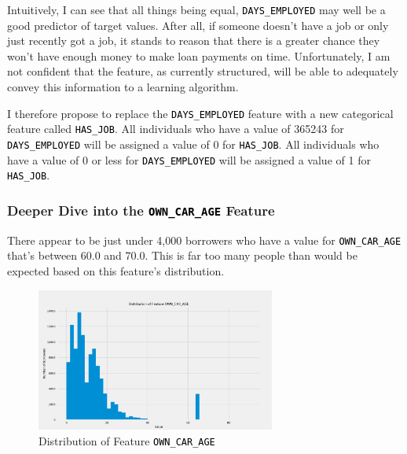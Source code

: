 \documentclass[12pt, letterpaper]{article}
\begin{document}
Intuitively, I can see that all things being equal, \colorbox{backcolor}{\textcolor{black}{\texttt{DAYS_EMPLOYED}}} may well be a good predictor of target values. After all, if someone doesn't have a job or only just recently got a job, it stands to reason that there is a greater chance they won't have enough money to make loan payments on time. Unfortunately, I am not confident that the feature, as currently structured, will be able to adequately convey this information to a learning algorithm.

I therefore propose to replace the \colorbox{backcolor}{\textcolor{black}{\texttt{DAYS_EMPLOYED}}} feature with a new categorical feature called \colorbox{backcolor}{\textcolor{black}{\texttt{HAS_JOB}}}. All individuals who have a value of 365243 for \colorbox{backcolor}{\textcolor{black}{\texttt{DAYS_EMPLOYED}}} will be assigned a value of 0 for \colorbox{backcolor}{\textcolor{black}{\texttt{HAS_JOB}}}. All individuals who have a value of 0 or less for \colorbox{backcolor}{\textcolor{black}{\texttt{DAYS_EMPLOYED}}} will be assigned a value of 1 for \colorbox{backcolor}{\textcolor{black}{\texttt{HAS_JOB}}}.

\subsubsection{Deeper Dive into the \colorbox{backcolor}{\textcolor{black}{\texttt{OWN_CAR_AGE}}} Feature}
There appear to be just under 4,000 borrowers who have a value for \colorbox{backcolor}{\textcolor{black}{\texttt{OWN_CAR_AGE}}} that's between 60.0 and 70.0. This is far too many people than would be expected based on this feature's distribution.

\begin{figure}[ht]
\includegraphics[width=0.7\textwidth]{distribOWNCARAGE}
\centering
\caption{Distribution of Feature \colorbox{backcolor}{\textcolor{black}{\texttt{OWN_CAR_AGE}}}}
\end{figure}
\end{document}
